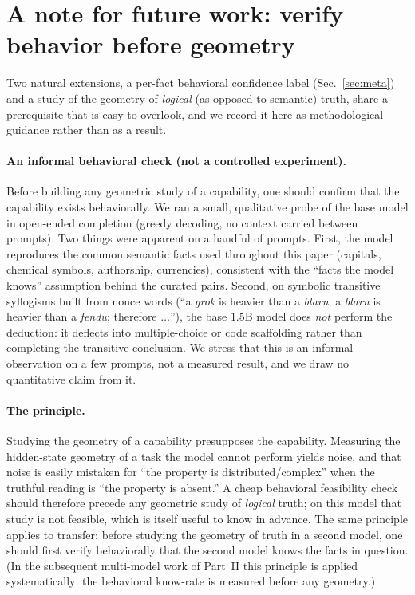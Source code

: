 \documentclass[11pt]{article}
\begin{document}
\section{A note for future work: verify behavior before geometry}
\label{sec:future}

Two natural extensions, a per-fact behavioral confidence label
(Sec.~\ref{sec:meta}) and a study of the geometry of \emph{logical} (as
opposed to semantic) truth, share a prerequisite that is easy to overlook,
and we record it here as methodological guidance rather than as a result.

\paragraph{An informal behavioral check (not a controlled experiment).}
Before building any geometric study of a capability, one should confirm that
the capability exists behaviorally. We ran a small, qualitative probe of the
base model in open-ended completion (greedy decoding, no context carried
between prompts). Two things were apparent on a handful of prompts. First,
the model reproduces the common semantic facts used throughout this paper
(capitals, chemical symbols, authorship, currencies), consistent with the
``facts the model knows'' assumption behind the curated pairs. Second, on
symbolic transitive syllogisms built from nonce words (``a \emph{grok} is
heavier than a \emph{blarn}; a \emph{blarn} is heavier than a \emph{fendu};
therefore $\ldots$''), the base $1.5$B model does \emph{not} perform the
deduction: it deflects into multiple-choice or code scaffolding rather than
completing the transitive conclusion. We stress that this is an informal
observation on a few prompts, not a measured result, and we draw no
quantitative claim from it.

\paragraph{The principle.} Studying the geometry of a capability presupposes
the capability. Measuring the hidden-state geometry of a task the model
cannot perform yields noise, and that noise is easily mistaken for ``the
property is distributed/complex'' when the truthful reading is ``the property
is absent.'' A cheap behavioral feasibility check should therefore precede
any geometric study of \emph{logical} truth; on this model that study is not
feasible, which is itself useful to know in advance. The same principle
applies to transfer: before studying the geometry of truth in a second model,
one should first verify behaviorally that the second model knows the facts in
question. (In the subsequent multi-model work of
Part~II this principle is applied systematically: the
behavioral know-rate is measured before any geometry.)
\end{document}
